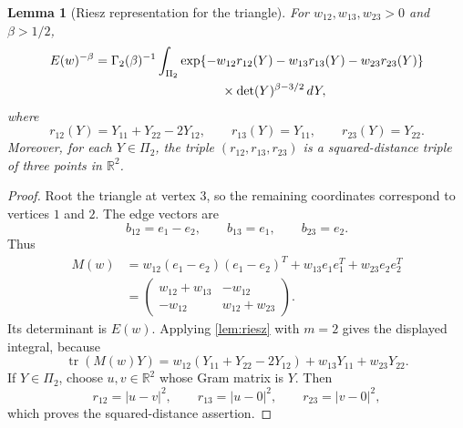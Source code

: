 \documentclass[preprint,12pt,authoryear]{elsarticle}
\numberwithin{equation}{section}
\newtheorem{lemma}[theorem]{Lemma}
\theoremstyle{definition}
\theoremstyle{remark}
\newcommand{\R}{\mathbb{R}}
\newcommand{\tr}{\operatorname{tr}}
\newcommand{\1}{\mathbf{1}}
\begin{document}
\begin{lemma}[Riesz representation for the triangle]
\label{lem:triangle-riesz}
For $w_{12},w_{13},w_{23}>0$ and $\beta>1/2$,
\begin{equation}
\begin{aligned}
 E(w)^{-\beta}
 &=
 \Gamma_2(\beta)^{-1}
 \int_{\Pi_2}
 \exp\{-w_{12}r_{12}(Y)-w_{13}r_{13}(Y)-w_{23}r_{23}(Y)\} \\
 &\hspace{35mm}\times
 \det(Y)^{\beta-3/2}\,dY,
\end{aligned}
\end{equation}
where
\begin{equation}
        r_{12}(Y)=Y_{11}+Y_{22}-2Y_{12},
        \qquad
        r_{13}(Y)=Y_{11},
        \qquad
        r_{23}(Y)=Y_{22}.
\end{equation}
Moreover, for each $Y\in\Pi_2$, the triple $(r_{12},r_{13},r_{23})$ is a squared-distance triple of three points in $\R^2$.
\end{lemma}

\begin{proof}
Root the triangle at vertex $3$, so the remaining coordinates correspond to vertices $1$ and $2$.  The edge vectors are
\begin{equation}
        b_{12}=e_1-e_2,
        \qquad b_{13}=e_1,
        \qquad b_{23}=e_2.
\end{equation}
Thus
\begin{align}
        M(w)
        &=
        w_{12}(e_1-e_2)(e_1-e_2)^T
        +w_{13}e_1e_1^T+w_{23}e_2e_2^T  \\
        &=
        \begin{pmatrix}
        w_{12}+w_{13} & -w_{12}\\
        -w_{12} & w_{12}+w_{23}
        \end{pmatrix}.
\end{align}
Its determinant is $E(w)$.  Applying \cref{lem:riesz} with $m=2$ gives the displayed integral, because
\begin{equation}
        \tr(M(w)Y)
        =
        w_{12}(Y_{11}+Y_{22}-2Y_{12})
        +w_{13}Y_{11}+w_{23}Y_{22}.
\end{equation}
If $Y\in\Pi_2$, choose $u,v\in\R^2$ whose Gram matrix is $Y$.  Then
\begin{equation}
        r_{12}=|u-v|^2,
        \qquad r_{13}=|u-0|^2,
        \qquad r_{23}=|v-0|^2,
\end{equation}
which proves the squared-distance assertion.
\end{proof}
\end{document}
